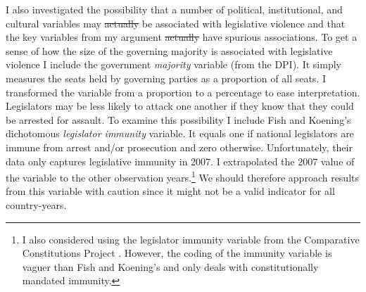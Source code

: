 \documentclass[a4paper]{article}\usepackage[]{graphicx}\usepackage[]{color}
\providecommand{\DIFdeltex}[1]{{\protect\color{red}\sout{#1}}}                      %
\providecommand{\DIFdelbegin}{} %
\providecommand{\DIFdelend}{} %
\providecommand{\DIFdel}[1]{\texorpdfstring{\DIFdeltex{#1}}{}} %
\begin{document}
I also investigated the possibility that a number of political, institutional, and cultural variables may \DIFdelbegin \DIFdel{actually }\DIFdelend be associated with legislative violence and that the key variables from my argument \DIFdelbegin \DIFdel{actually }\DIFdelend have spurious associations. To get a sense of how the size of the governing majority is associated with legislative violence I include the government {\emph{majority}} variable (from the DPI). It simply measures the seats held by governing parties as a proportion of all seats. I transformed the variable from a proportion to a percentage to ease interpretation. Legislators may be less likely to attack one another if they know that they could be arrested for assault. To examine this possibility I include Fish and Koening's \citeyearpar{Fish2009} dichotomous \emph{legislator immunity} variable. It equals one if national legislators are immune from arrest and/or prosecution and zero otherwise. Unfortunately, their data only captures legislative immunity in 2007. I extrapolated the 2007 value of the variable to the other observation years.\footnote{I also considered using the legislator immunity variable from the Comparative Constitutions Project \citep{ElkinsCCP2010}. However, the coding of the immunity variable is vaguer than Fish and Koening's and only deals with constitutionally mandated immunity.} We should therefore approach results from this variable with caution since it might not be a valid indicator for all country-years.
\end{document}
